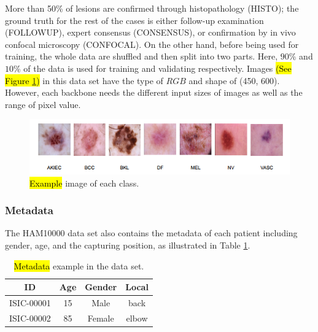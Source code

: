 \documentclass[sensors,article,accept,pdftex,moreauthors]{Definitions/mdpi}
\begin{document}
	
	More than 50\% of lesions are confirmed through histopathology (HISTO); the ground truth for the rest of the cases is either follow-up examination (FOLLOWUP), expert consensus (CONSENSUS), or confirmation by in vivo confocal microscopy (CONFOCAL). On the other hand, before being used for training, the whole data are shuffled and then split into two parts. Here, $90$\% and $10$\% of the data is used for training and validating respectively. Images \hl{(See Figure \mbox{\ref{fig:data-sample}})} in this data set have the type of $RGB$ and shape of (450, 600). However, each backbone needs the different input sizes of images as well as the range of pixel value.
	\begin{figure}[H]
		\includegraphics[width=1\linewidth]{Definitions/DataDistribution}
		\caption{\hl{Example} %
 image of each class.}
		\label{fig:data-sample}
	\end{figure}	
	
	\subsubsection{Metadata}
	The HAM10000 data set \cite{10417} also contains the metadata of each patient including gender, age, and the capturing position, as illustrated in Table \ref{table:metadata sample}.
	\begin{table}[H]
		\caption{\hl{Metadata}  example in the data set.}%
		\label{table:metadata sample}
		\setlength{\tabcolsep}{11.8mm}\begin{tabular}{c c c c } 
\toprule
\textbf{ID} & \textbf{Age} & \textbf{Gender} & \textbf{Local}\\ 
\midrule
ISIC-00001 & 15 & Male & back\\
\midrule
ISIC-00002 & 85 & Female & elbow\\
\bottomrule
		\end{tabular}
	\end{table}
\end{document}
